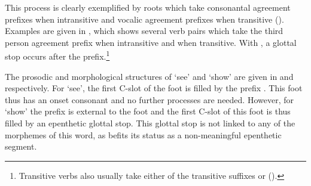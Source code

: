 This process is clearly exemplified by roots which
take consonantal agreement prefixes when intransitive
and vocalic agreement prefixes when transitive ().
Examples are given in ,
which shows several verb pairs which take the third person
agreement prefix  when intransitive and  when transitive.
With , a glottal stop occurs after the prefix.\footnote{
		Transitive verbs also usually take either
		of the transitive suffixes
		 or  ().}

The prosodic and morphological structures of  `see' and  `show'
are given in  and  respectively.
For  `see', the first C-slot of the foot is filled by the prefix .
This foot thus has an onset consonant and no further processes are needed.
However, for  `show' the prefix is external to the foot
and the first C-slot of this foot is thus filled by an epenthetic glottal stop.
This glottal stop is not linked to any of the morphemes
of this word, as befits its status as a non-meaningful epenthetic segment.

